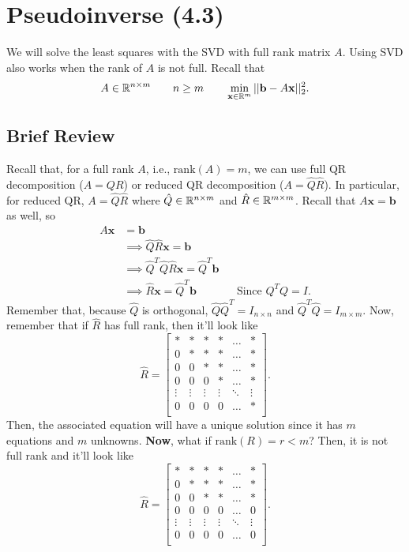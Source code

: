 \documentclass[letterpaper]{article}
\newcommand{\0}{\mathbf{0}}
\renewcommand{\b}{\mathbf{b}}
\newcommand{\x}{\mathbf{x}}
\begin{document}
\section{Pseudoinverse (4.3)}
We will solve the least squares with the SVD with full rank matrix $A$. Using SVD also works when the rank of $A$ is not full. Recall that 
\[A \in \R^{n \times m} \qquad n \geq m \qquad \min_{\x \in \R^m} ||\b - A\x||_2^2.\]

\subsection{Brief Review}
Recall that, for a full rank $A$, i.e., $\text{rank}(A) = m$, we can use full QR decomposition ($A = QR$) or reduced QR decomposition ($A = \hat{Q}\hat{R}$). In particular, for reduced QR, $A = \hat{Q}\hat{R}$ where $\hat{Q} \in \mathbb{R}^{n \times m}$ and $\hat{R} \in \mathbb{R}^{m \times m}$. Recall that $A\x = \b$ as well, so 
\begin{equation*}
    \begin{aligned}
        A\x &= \b \\ 
            &\implies \hat{Q}\hat{R}\x = \b \\ 
            &\implies \hat{Q}^{T}\hat{Q}\hat{R}\x = \hat{Q}^{T}\b \\ 
            &\implies \hat{R}\x = \hat{Q}^{T}\b && \text{Since } Q^T Q = I.
    \end{aligned}
\end{equation*}
Remember that, because $\hat{Q}$ is orthogonal, $\hat{Q} \hat{Q}^T = I_{n \times n}$ and $\hat{Q}^T \hat{Q} = I_{m \times m}$. Now, remember that if $\hat{R}$ has full rank, then it'll look like 
\[\hat{R} = \begin{bmatrix}
    * & * & * & * & \hdots & * \\ 
    0 & * & * & * & \hdots & * \\ 
    0 & 0 & * & * & \hdots & * \\ 
    0 & 0 & 0 & * & \hdots & * \\ 
    \vdots & \vdots & \vdots & \vdots & \ddots & \vdots \\ 
    0 & 0 & 0 & 0 & \hdots & * \\ 
\end{bmatrix}.\]
Then, the associated equation will have a unique solution since it has $m$ equations and $m$ unknowns. \textbf{Now}, what if $\text{rank}(R) = r < m$? Then, it is not full rank and it'll look like 
\[\hat{R} = \begin{bmatrix}
    * & * & * & * & \hdots & * \\ 
    0 & * & * & * & \hdots & * \\ 
    0 & 0 & * & * & \hdots & * \\ 
    0 & 0 & 0 & 0 & \hdots & 0 \\ 
    \vdots & \vdots & \vdots & \vdots & \ddots & \vdots \\ 
    0 & 0 & 0 & 0 & \hdots & 0 \\ 
\end{bmatrix}.\]
\end{document}
